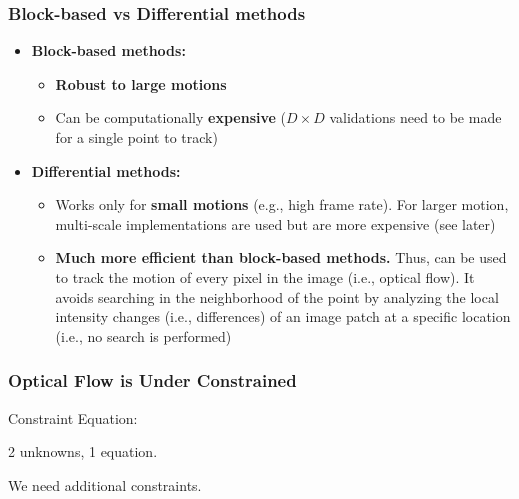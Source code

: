 \begin{frame}
    \frametitle{Block-based vs Differential methods}
    
    \begin{itemize}
        \item \textbf{Block-based methods:}
        \begin{itemize}
            \item \textbf{Robust to large motions}
            \item Can be computationally \textbf{expensive} ($D \times D$ validations need to be made for a single point to track)
        \end{itemize}
    \end{itemize}

    \vspace{0.5em} %

    \begin{itemize}
        \item \textbf{Differential methods:}
        \begin{itemize}
            \item Works only for \textbf{small motions} (e.g., high frame rate). For larger motion, multi-scale implementations are used but are more expensive (see later)
            \item \textbf{Much more efficient than block-based methods.} Thus, can be used to track the motion of every pixel in the image (i.e., optical flow). It avoids searching in the neighborhood of the point by analyzing the local intensity changes (i.e., differences) of an image patch at a specific location (i.e., no search is performed)
        \end{itemize}
    \end{itemize}

\end{frame}

\begin{frame}
  \frametitle{Optical Flow is Under Constrained}

  Constraint Equation: \quad {}

  \vspace{0.5cm}
  2 unknowns, 1 equation.

  \vspace{1cm}
  We need additional constraints.

\end{frame}

